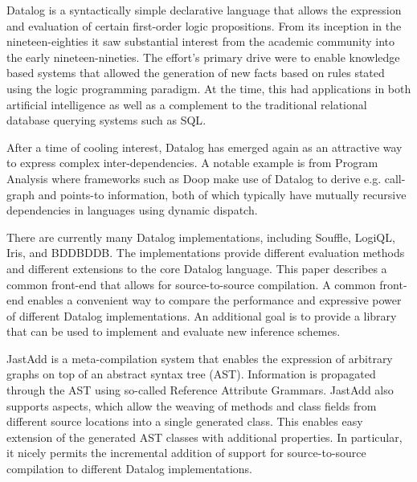 Datalog is a syntactically simple declarative language that allows the expression and evaluation of certain first-order logic propositions. From its inception in the nineteen-eighties it saw substantial interest from the academic community into the early nineteen-nineties\cite{Green:2013:DRQ:2688167.2688168}. The effort's primary drive were to enable knowledge based systems that allowed the generation of new facts based on rules stated using the logic programming paradigm. At the time, this had applications in both artificial intelligence as well as a complement to the traditional relational database querying systems such as SQL\cite{Ceri:1989:YAW:627272.627357}\cite{Bancilhon:1986:AIR:16894.16859}.

After a time of cooling interest, Datalog has emerged again as an attractive way to express complex inter-dependencies\cite{Green:2013:DRQ:2688167.2688168}. A notable example is from Program Analysis where frameworks such as Doop\cite{Smaragdakis:2010:UDF:2185923.2185939} make use of Datalog to derive e.g. call-graph and points-to information, both of which typically have mutually recursive dependencies in languages using dynamic dispatch. 

There are currently many Datalog implementations, including Souffle\cite{Scholz:2016:FLP:2892208.2892226}, LogiQL\cite{Aref:2015:DIL:2723372.2742796}, Iris\cite{Bishop_iris-integrated}, and BDDBDDB\cite{Whaley:2005:UDB:2099708.2099719}. The implementations provide different evaluation methods and different extensions to the core Datalog language. This paper describes a common front-end that allows for source-to-source compilation. A common front-end enables a convenient way to compare the performance and expressive power of different Datalog implementations. An additional goal is to provide a library that can be used to implement and evaluate new inference schemes.

JastAdd \cite{Ekman:2007:JEJ:1297105.1297029} is a meta-compilation system that enables the expression of arbitrary graphs on top of an abstract syntax tree (AST). Information is propagated through the AST using so-called Reference Attribute Grammars\cite{Ekman:2007:JEJ:1297105.1297029}. JastAdd also supports aspects, which allow the weaving of methods and class fields from different source locations into a single generated class. This enables easy extension of the generated AST classes with additional properties. In particular, it nicely permits the incremental addition of support for source-to-source compilation to different Datalog implementations. 

